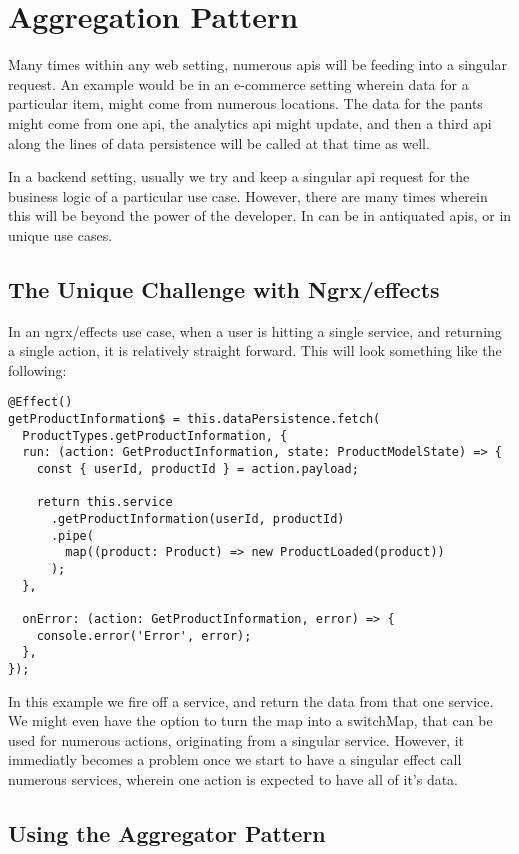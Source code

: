 
\section{ Aggregation Pattern }

Many times within any web setting, numerous apis will be feeding into a singular
request. An example would be in an e-commerce setting wherein data for a
particular item, might come from numerous locations. The data for the pants
might come from one api, the analytics api might update, and then a third api
along the lines of data persistence will be called at that time as well.

In a backend setting, usually we try and keep a singular api request for the
business logic of a particular use case. However, there are many times wherein
this will be beyond the power of the developer. In can be in antiquated apis,
or in unique use cases.

\subsection{ The Unique Challenge with Ngrx/effects}
In an ngrx/effects use case, when a user is hitting a single service, and
returning a single action, it is relatively straight forward. This will look
something like the following:
\begin{lstlisting}
@Effect()
getProductInformation$ = this.dataPersistence.fetch(
  ProductTypes.getProductInformation, {
  run: (action: GetProductInformation, state: ProductModelState) => {
    const { userId, productId } = action.payload;

    return this.service
      .getProductInformation(userId, productId)
      .pipe(
        map((product: Product) => new ProductLoaded(product))
      );
  },

  onError: (action: GetProductInformation, error) => {
    console.error('Error', error);
  },
});
\end{lstlisting}

In this example we fire off a service, and return the data from that one
service. We might even have the option to turn the map into a switchMap, that
can be used for numerous actions, originating from a singular service. However,
it immediatly becomes a problem once we start to have a singular effect call
numerous services, wherein one action is expected to have all of it's data.

\subsection{Using the Aggregator Pattern}

